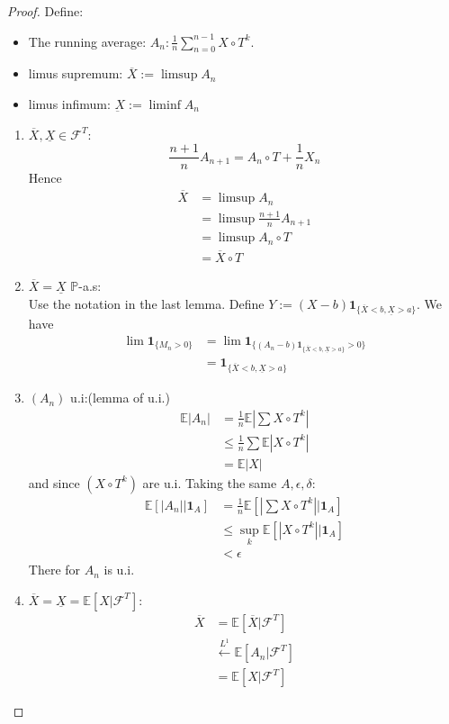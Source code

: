 \begin{proof}
Define:
\begin{itemize}
		\item The running average: $A_n:\frac{1}{n} \sum_{n = 0}^{n-1} X \circ T^k$.
		\item limus supremum: $\overline{X}:= \limsup A_n$
		\item limus infimum: $\underbar{X} := \liminf A_n$
\end{itemize}
\begin{enumerate}
	\item \textbf{$\overline{X}, \underline{X} \in \mathcal{F}^T$}:
	\begin{equation*}
		\frac{n + 1}{n} A_{n+1} = A_n \circ T + \frac{1}{n} X_n
	\end{equation*}
	Hence
	\begin{align*}
		\overline{X} &= \limsup A_n\\
		&= \limsup \frac{n+1}{n} A_{n+1}\\
		&= \limsup A_n \circ T\\
		&= \overline{X} \circ T
	\end{align*}
	
	\item $\overline{X} = \underline{X}$ $\mathbb{P}$-a.s:\\
	Use the notation in the last lemma. Define $Y:= (X - b) \textbf{1}_{\{\overline{X} < b, \underline{X} > a \}}$. We have
	\begin{align*}
		\lim \textbf{1}_{\{M_n > 0\}} &= \lim \textbf{1}_{\{(A_n - b) \textbf{1}_{\{\overline{X} < b, \underline{X} > a \}} > 0 \}} \\
		&= \textbf{1}_{\{\overline{X} < b, \underline{X} > a \}}
	\end{align*}
	
	\item $(A_n)$ u.i:(lemma of u.i.)
	\begin{align*}
		\mathbb{E}|A_n| &= \frac{1}{n}\mathbb{E}|\sum X \circ T^k|\\
		&\leq \frac{1}{n} \sum \mathbb{E}|X \circ T^k|\\
		&= \mathbb{E}|X|
	\end{align*}
	and since $(X \circ T^k)$ are u.i. Taking the same $A, \epsilon, \delta$: 
	\begin{align*}
		\mathbb{E}[|A_n|| \textbf{1}_A] &= \frac{1}{n} \mathbb{E}[|\sum X \circ T^k| | \textbf{1}_A]\\
		&\leq \sup_k \mathbb{E}[|X \circ T^k||\textbf{1}_A]\\
		& < \epsilon
	\end{align*}
	There for $A_n$ is u.i.
	\item $\overline{X} = \underline{X} = \mathbb{E}[X|\mathcal{F}^T]$:
	\begin{align*}
		\overline{X} &= \mathbb{E}[\overline{X}|\mathcal{F}^T]\\
		&\overset{L^1}\leftarrow \mathbb{E}[A_n|\mathcal{F}^T]\\
		&= \mathbb{E}[X|\mathcal{F}^T]
	\end{align*}
	
\end{enumerate}
\end{proof}

